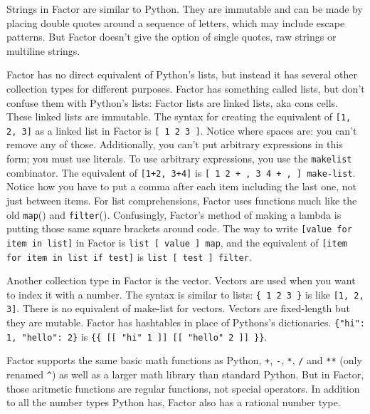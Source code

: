 \documentclass{article}
\begin{document}
Strings in Factor are similar to Python. They are immutable and can be made by placing double quotes around a sequence of letters, which may include escape patterns. But Factor doesn't give the option of single quotes, raw strings or multiline strings.

Factor has no direct equivalent of Python's lists, but instead it has several other collection types for different purposes. Factor has something called lists, but don't confuse them with Python's lists: Factor lists are linked lists, aka cons cells. These linked lists are immutable. The syntax for creating the equivalent of \verb|[1, 2, 3]| as a linked list in Factor is \verb|[ 1 2 3 ]|. Notice where spaces are: you can't remove any of those. Additionally, you can't put arbitrary expressions in this form; you must use literals. To use arbitrary expressions, you use the \texttt{makelist} combinator. The equivalent of \verb|[1+2, 3+4]| is \verb|[ 1 2 + , 3 4 + , ] make-list|. Notice how you have to put a comma after each item including the last one, not just between items. For list comprehensions, Factor uses functions much like the old \texttt{map}() and \texttt{filter}(). Confusingly, Factor's method of making a lambda is putting those same square brackets around code. The way to write \verb|[value for item in list]| in Factor is \verb|list [ value ] map|, and the equivalent of \verb|[item for item in list if test]| is \verb|list [ test ] filter|.

Another collection type in Factor is the vector. Vectors are used when you want to index it with a number. The syntax is similar to lists: \verb|{ 1 2 3 }| is like \verb|[1, 2, 3]|. There is no equivalent of make-list for vectors. Vectors are fixed-length but they are mutable. Factor has hashtables in place of Pythons's dictionaries. \verb|{"hi": 1, "hello": 2}| is \verb|{{ [[ "hi" 1 ]] [[ "hello" 2 ]] }}|.

Factor supports the same basic math functions as Python, \texttt{+}, \texttt{-}, \texttt{*}, \texttt{/} and \texttt{**} (only renamed \texttt{\^{}}) as well as a larger math library than standard Python. But in Factor, those aritmetic functions are regular functions, not special operators. In addition to all the number types Python has, Factor also has a rational number type.
\end{document}
